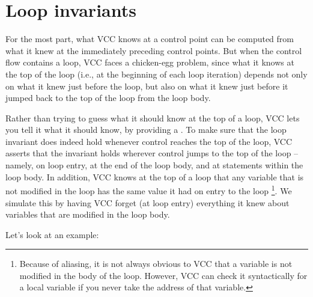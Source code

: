 \section{Loop invariants}

For the most part, what VCC knows at a control point can be
computed from what it knew at the immediately preceding control
points. But when the control flow contains a loop, VCC faces a
chicken-egg problem, since what it knows at the top of the loop (i.e.,
at the beginning of each loop iteration) depends not only on what it
knew just before the loop, but also on what it knew just before it
jumped back to the top of the loop from the loop body.

Rather than trying to guess what it should know at the top of a loop,
VCC lets you tell it what it should know, by providing a . To make sure that the loop invariant does indeed hold 
whenever control reaches the top
of the loop, VCC asserts that the invariant holds wherever control
jumps to the top of the loop -- namely, on loop entry, at the end of
the loop body, and at  statements within the loop body.
In addition, VCC knows at the top of a loop
that any variable that is not modified in the loop has 
the same value it had on entry to the loop%
\footnote{ Because of aliasing, it is not always obvious to VCC that a
  variable is not modified in the body of the loop. However, VCC can
  check it syntactically for a local variable if you never take the
  address of that variable.}. We simulate this by having VCC forget
(at loop entry) everything it knew about variables that are modified
in the loop body.

Let's look at an example:

